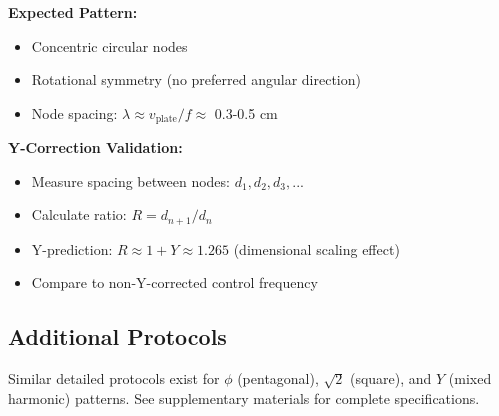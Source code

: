 \documentclass[11pt,a4paper]{article}
\begin{document}
\textbf{Expected Pattern:}
\begin{itemize}
    \item Concentric circular nodes
    \item Rotational symmetry (no preferred angular direction)
    \item Node spacing: $\lambda \approx v_{\text{plate}} / f \approx$ 0.3-0.5 cm
\end{itemize}

\textbf{Y-Correction Validation:}
\begin{itemize}
    \item Measure spacing between nodes: $d_1, d_2, d_3, ...$
    \item Calculate ratio: $R = d_{n+1} / d_n$
    \item Y-prediction: $R \approx 1 + Y \approx 1.265$ (dimensional scaling effect)
    \item Compare to non-Y-corrected control frequency
\end{itemize}

\subsection{Additional Protocols}

Similar detailed protocols exist for $\phi$ (pentagonal), $\sqrt{2}$ (square), and $Y$ (mixed harmonic) patterns. See supplementary materials for complete specifications.
\end{document}
